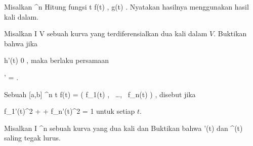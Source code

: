 \setcounter{section}{2}


{}
{

Misalkan
 {\R} { \R^n
} {}
Hitung
fungsi
\maabbeledisp {} {\R} {\R
} { t } { \left\langle f(t) , g(t)  \right\rangle
} {.}
Nyatakan hasilnya menggunakan hasil kali dalam.

}
{} {}

{}
{

Misalkan
 { I } { V
} {}
sebuah kurva yang terdiferensialkan dua kali dalam
$V$. Buktikan bahwa jika

\mavergleichskette
{\vergleichskette
{h'(t)
}
{ \neq }{ 0
}
{  }{
}
{    }{
}
{   }{
}
}
{}{}{,}
maka berlaku persamaan

\mavergleichskettedisp
{\vergleichskette
{  \Vert'
}
{ =} { {  }  \Vert
}
{ } {
}
{ } {
}
{ } {
}
}
{}{}{.}

}
{} {}

Sebuah
 { [a,b] } {\R^n
} { t } {f(t) = \left( f_1(t)  , \,   \ldots  , \,  f_n(t)                 \right)
} {,}
disebut
jika

\mavergleichskette
{\vergleichskette
{ f_1'(t)^2 + \cdots +  f_n'(t)^2
}
{ = }{ 1
}
{  }{
}
{    }{
}
{   }{
}
}
{}{}{}
untuk setiap $t$.

{}
{

Misalkan
\maabb {\gamma} { I } {\R^n
} {}
sebuah kurva yang dua kali
dan
Buktikan bahwa
\mathkor {} {\gamma'(t)} {dan} {\gamma^{\prime \prime}(t)} {}
saling tegak lurus.

}
{} {}

